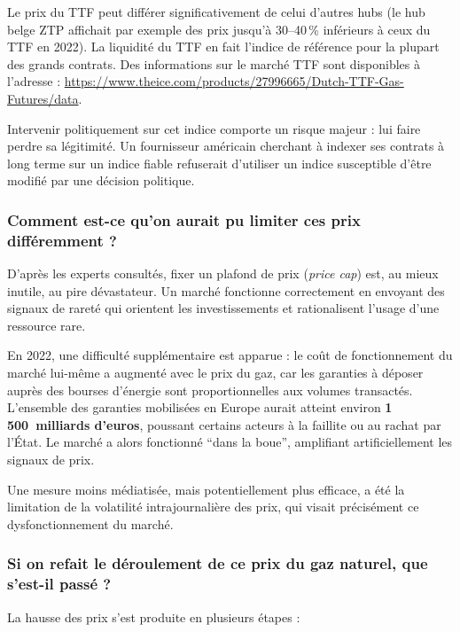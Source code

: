 Le prix du TTF peut différer significativement de celui d'autres hubs (le hub belge ZTP affichait par exemple des prix jusqu'à 30--40\,\% inférieurs à ceux du TTF en 2022). La liquidité du TTF en fait l'indice de référence pour la plupart des grands contrats. Des informations sur le marché TTF sont disponibles à l'adresse : \url{https://www.theice.com/products/27996665/Dutch-TTF-Gas-Futures/data}.

Intervenir politiquement sur cet indice comporte un risque majeur : lui faire perdre sa légitimité. Un fournisseur américain cherchant à indexer ses contrats à long terme sur un indice fiable refuserait d'utiliser un indice susceptible d'être modifié par une décision politique.

\subsubsection{Comment est-ce qu'on aurait pu limiter ces prix différemment ?}

D'après les experts consultés, fixer un plafond de prix (\textit{price cap}) est, au mieux inutile, au pire dévastateur. Un marché fonctionne correctement en envoyant des signaux de rareté qui orientent les investissements et rationalisent l'usage d'une ressource rare.

En 2022, une difficulté supplémentaire est apparue : le coût de fonctionnement du marché lui-même a augmenté avec le prix du gaz, car les garanties à déposer auprès des bourses d'énergie sont proportionnelles aux volumes transactés. L'ensemble des garanties mobilisées en Europe aurait atteint environ \textbf{1\,500~milliards d'euros}, poussant certains acteurs à la faillite ou au rachat par l'État. Le marché a alors fonctionné \enquote{dans la boue}, amplifiant artificiellement les signaux de prix.

Une mesure moins médiatisée, mais potentiellement plus efficace, a été la limitation de la volatilité intrajournalière des prix, qui visait précisément ce dysfonctionnement du marché.

\subsubsection{Si on refait le déroulement de ce prix du gaz naturel, que s'est-il passé ?}

La hausse des prix s'est produite en plusieurs étapes :

